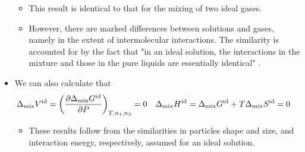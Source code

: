 \documentclass[../notes.tex]{subfiles}
\begin{document}
\begin{itemize}
\begin{itemize}
        \item This result is identical to that for the mixing of two ideal gases.
        \item However, there are marked differences between solutions and gases, namely in the extent of intermolecular interactions. The similarity is accounted for by the fact that "in an ideal solution, the interactions in the mixture and those in the pure liquids are essentially identical" \parencite[977]{bib:McQuarrieSimon}.
    \end{itemize}
    \item We can also calculate that
    \begin{align*}
        \Delta_\text{mix}V^\text{id} &= \left( \pdv{\Delta_\text{mix}G^\text{id}}{P} \right)_{T,n_1,n_2} = 0&
        \Delta_\text{mix}H^\text{id} &= \Delta_\text{mix}G^\text{id}+T\Delta_\text{mix}S^\text{id} = 0
    \end{align*}
    \begin{itemize}
        \item These results follow from the similarities in particles shape and size, and interaction energy, respectively, assumed for an ideal solution.
    \end{itemize}
\end{itemize}
\end{document}
